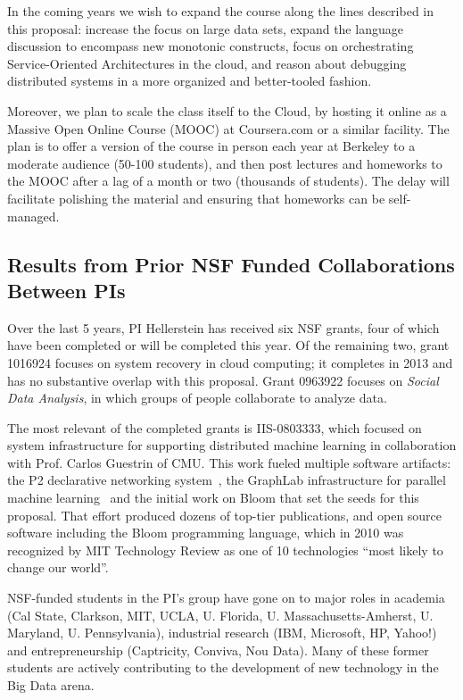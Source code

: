 In the coming years we wish to expand the course along the lines described in this proposal: increase the focus on large data sets, expand the language discussion to encompass new monotonic constructs, focus on orchestrating Service-Oriented Architectures in the cloud, and reason about debugging distributed systems in a more organized and better-tooled fashion.  

Moreover, we plan to scale the class itself to the Cloud, by hosting it online as a Massive Open Online Course (MOOC) at Coursera.com or a similar facility.  The plan is to offer a version of the course in person each year at Berkeley to a moderate audience (50-100 students), and then post lectures and homeworks to the MOOC after a lag of a month or two (thousands of students). The delay will facilitate polishing the material and ensuring that homeworks can be self-managed.

\subsection{Results from Prior NSF Funded Collaborations Between PIs}
\label{sec:prior}

Over the last 5 years, PI Hellerstein has received six NSF grants, four of which have been completed or will be completed this year.  Of the remaining two, grant 1016924 focuses on system recovery in cloud computing; it
completes in 2013 and has no substantive overlap with this
proposal. Grant 0963922 focuses on \emph{Social Data Analysis}, in which groups of people collaborate to analyze data. 

The most relevant of the completed grants is IIS-0803333, which focused on system infrastructure for supporting distributed machine learning in collaboration with Prof. Carlos Guestrin of CMU.  This work fueled multiple software artifacts: the P2 declarative networking system~\cite{p2}, the GraphLab infrastructure for parallel machine learning~\cite{uaigraphlab} and the initial work on Bloom that set the seeds for this proposal.  That effort produced dozens of top-tier publications, and
open source software including the Bloom programming language,
which in 2010 was recognized by MIT Technology Review as one of 10
technologies ``most likely to change our world''.  

NSF-funded students in the PI's group have gone on to major roles in academia (Cal State, Clarkson, MIT, UCLA, U. Florida, U. Massachusetts-Amherst, U. Maryland, U. Pennsylvania), industrial research (IBM, Microsoft, HP, Yahoo!) and entrepreneurship (Captricity, Conviva, Nou Data).  Many of these former students are actively contributing to the development of new technology in the Big Data arena.


